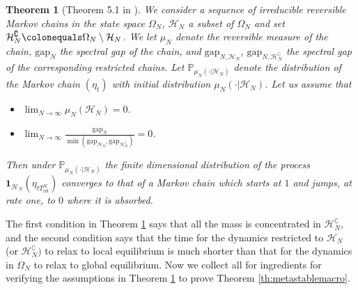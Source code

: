 \documentclass[reqno,11pt]{amsart}
\numberwithin{equation}{section}
\newcommand{\bbP}{{\ensuremath{\mathbb P}} }
\newcommand{\gO}{\Omega}
\newcommand{\cH}{{\ensuremath{\mathcal H}} }
\newcommand{\ind}{\mathbf{1}}
\newtheorem{theorem}{Theorem}[section]
\newcommand{\Gap}{\mathrm{gap}}
\newcommand{\Rel}{\mathrm{rel}}
\begin{document}
\begin{theorem}[Theorem 5.1 in \cite{lacoin2015mathematical}]\label{th:metastab}
We  consider a sequence of  irreducible reversible Markov chains in the state space $\gO_N$, $\cH_N$ a subset of $\gO_N$ and set $\cH_N^{\complement} \colonequals \gO_N \setminus \cH_N$.
We let $\mu_N$ denote the reversible measure of the chain, $\Gap_N$ the spectral gap of the chain, and $\Gap_{N,\cH_N}$,  $\Gap_{N,\cH_N^{\complement}}$ the spectral gap of the corresponding restricted chains.
Let $\bbP_{\mu_N( \cdot \vert \cH_N)}$ denote the distribution of the Markov chain $(\eta_t)$ with initial distribution $\mu_N( \cdot \vert \cH_N)$.
Let us assume that
 \begin{itemize}
 \item[(1)] $\lim_{N\to \infty}\mu_N(\cH_N)=0$. 
 
 \item[(2)] $\lim_{N\to \infty}\frac{\Gap_N}{ \min( \Gap_{\cH_N},  \Gap_{\cH_N^{\complement}})}=0$.
 \end{itemize}
Then under $\bbP_{\mu_N( \cdot \vert \cH_N)}$ the finite dimensional distribution of the process $\ind_{\cH_N}(\eta_{t T_{\Rel}^N})$ converges to that of a Markov chain
   which starts at $1$ and jumps, at rate one,  to  $0$ where it is absorbed.

\end{theorem}

 The first condition in Theorem \ref{th:metastab} says that all the mass is concentrated in $\cH_N^{\complement}$, and the second condition says that the time for the dynamics restricted to $\cH_N$ (or $\cH_N^{\complement})$ to relax to local equilibrium is much shorter than that for the dynamics in $\gO_N$ to relax to global equilibrium.
Now we collect all for ingredients for verifying the assumptions in Theorem \ref{th:metastab} to prove Theorem \ref{th:metastablemacro}.
\end{document}
